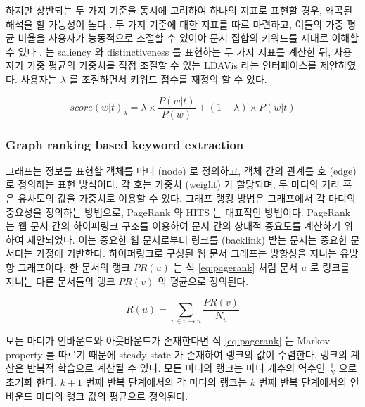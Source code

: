 \documentclass[11pt]{article}
\begin{document}
하지만 상반되는 두 가지 기준을 동시에 고려하여 하나의 지표로 표현할 경우, 왜곡된 해석을 할 가능성이 높다 \citep{chuang2012interpretation}. 
두 가지 기준에 대한 지표를 따로 마련하고, 이들의 가중 평균 비율을 사용자가 능동적으로 조절할 수 있어야 문서 집합의 키워드를 제대로 이해할 수 있다 \citep{chuang2012interpretation}.
\citep{sievert2014ldavis}는 saliency 와 distinctiveness 를 표현하는 두 가지 지표를 계산한 뒤, 사용자가 가중 평균의 가중치를 직접 조절할 수 있는 LDAVis 라는 인터페이스를 제안하였다.
사용자는 $\lambda$ 를 조절하면서 키워드 점수를 재정의 할 수 있다.

\begin{equation}
  \label{eq:ldavis}
  score(w \vert t)_\lambda = \lambda \times \frac{P(w \vert t)}{P(w)} + (1 - \lambda) \times P(w \vert t)
\end{equation}

\subsubsection{Graph ranking based keyword extraction}

그래프는 정보를 표현할 객체를 마디 (node) 로 정의하고, 객체 간의 관계를 호 (edge) 로 정의하는 표현 방식이다.
각 호는 가중치 (weight) 가 할당되며, 두 마디의 거리 혹은 유사도의 값을 가중치로 이용할 수 있다.
그래프 랭킹 방법은 그래프에서 각 마디의 중요성을 정의하는 방법으로, PageRank \citep{ilprints422}와 HITS \citep{kleinberg1999authoritative} 는 대표적인 방법이다.
PageRank 는 웹 문서 간의 하이퍼링크 구조를 이용하여 문서 간의 상대적 중요도를 계산하기 위하여 제안되었다.
이는 중요한 웹 문서로부터 링크를 (backlink) 받는 문서는 중요한 문서다는 가정에 기반한다.
하이퍼링크로 구성된 웹 문서 그래프는 방향성을 지니는 유방향 그래프이다.
한 문서의 랭크 $PR(u)$ 는 식 \ref{eq:pagerank} 처럼 문서 $u$ 로 링크를 지니는 다른 문서들의 랭크 $PR(v)$ 의 평균으로 정의된다.

\begin{equation}
  \label{eq:pagerank}
  R(u) = \sum_{v \in v \rightarrow u} \frac{PR(v)}{N_v}
\end{equation}

모든 마디가 인바운드와 아웃바운드가 존재한다면 식 \ref{eq:pagerank} 는 Markov property 를 따르기 때문에 steady state 가 존재하여 랭크의 값이 수렴한다.
랭크의 계산은 반복적 학습으로 계산될 수 있다.
모든 마디의 랭크는 마디 개수의 역수인 $\frac{1}{N}$ 으로 초기화 한다.
$k+1$ 번째 반복 단계에서의 각 마디의 랭크는 $k$ 번째 반복 단계에서의 인바운드 마디의 랭크 값의 평균으로 정의된다.
\end{document}
